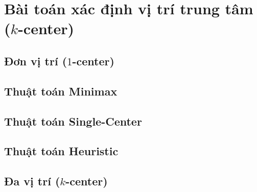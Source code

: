\section{Bài toán xác định vị trí trung tâm ($k$-center)}
\subsection{Đơn vị trí ($1$-center)}
\subsection*{Thuật toán Minimax}
\subsection*{Thuật toán Single-Center}



\subsection*{Thuật toán Heuristic}



\subsection{Đa vị trí ($k$-center)}